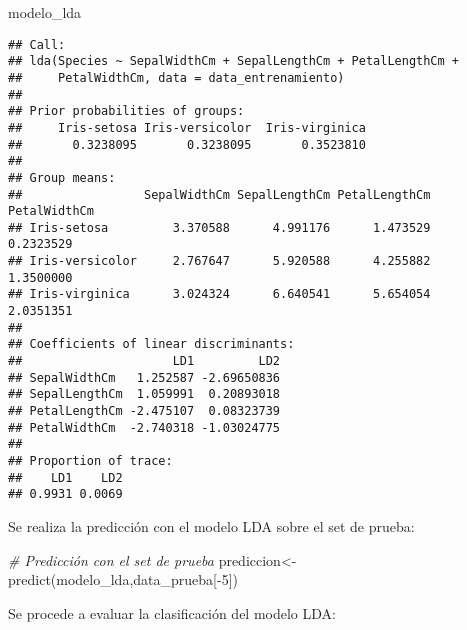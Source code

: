 \documentclass[
]{article}
\newenvironment{Shaded}{\begin{snugshade}}{\end{snugshade}}
\newcommand{\AttributeTok}[1]{\textcolor[rgb]{0.77,0.63,0.00}{#1}}
\newcommand{\CommentTok}[1]{\textcolor[rgb]{0.56,0.35,0.01}{\textit{#1}}}
\newcommand{\DecValTok}[1]{\textcolor[rgb]{0.00,0.00,0.81}{#1}}
\newcommand{\FunctionTok}[1]{\textcolor[rgb]{0.00,0.00,0.00}{#1}}
\newcommand{\NormalTok}[1]{#1}
\newcommand{\OtherTok}[1]{\textcolor[rgb]{0.56,0.35,0.01}{#1}}
\newcommand{\SpecialCharTok}[1]{\textcolor[rgb]{0.00,0.00,0.00}{#1}}
\newcommand{\StringTok}[1]{\textcolor[rgb]{0.31,0.60,0.02}{#1}}
\begin{document}
\begin{Shaded}
\begin{Highlighting}[]
\NormalTok{modelo\_lda}
\end{Highlighting}
\end{Shaded}

\begin{verbatim}
## Call:
## lda(Species ~ SepalWidthCm + SepalLengthCm + PetalLengthCm + 
##     PetalWidthCm, data = data_entrenamiento)
## 
## Prior probabilities of groups:
##     Iris-setosa Iris-versicolor  Iris-virginica 
##       0.3238095       0.3238095       0.3523810 
## 
## Group means:
##                 SepalWidthCm SepalLengthCm PetalLengthCm PetalWidthCm
## Iris-setosa         3.370588      4.991176      1.473529    0.2323529
## Iris-versicolor     2.767647      5.920588      4.255882    1.3500000
## Iris-virginica      3.024324      6.640541      5.654054    2.0351351
## 
## Coefficients of linear discriminants:
##                     LD1         LD2
## SepalWidthCm   1.252587 -2.69650836
## SepalLengthCm  1.059991  0.20893018
## PetalLengthCm -2.475107  0.08323739
## PetalWidthCm  -2.740318 -1.03024775
## 
## Proportion of trace:
##    LD1    LD2 
## 0.9931 0.0069
\end{verbatim}

Se realiza la predicción con el modelo LDA sobre el set de prueba:

\begin{Shaded}
\begin{Highlighting}[]
\CommentTok{\# Predicción con el set de prueba}
\NormalTok{prediccion}\OtherTok{\textless{}{-}}\FunctionTok{predict}\NormalTok{(modelo\_lda,data\_prueba[}\SpecialCharTok{{-}}\DecValTok{5}\NormalTok{])}
\end{Highlighting}
\end{Shaded}

Se procede a evaluar la clasificación del modelo LDA:

\begin{Shaded}
\end{Shaded}
\end{document}
